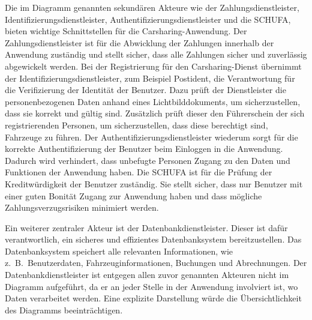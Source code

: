 Die im Diagramm genannten sekundären Akteure wie der Zahlungsdienstleister, Identifizierungsdienstleister, Authentifizierungsdienstleister und die SCHUFA, bieten wichtige Schnittstellen für die Carsharing-Anwendung.
Der Zahlungsdienstleister ist für die Abwicklung der Zahlungen innerhalb der Anwendung zuständig und stellt sicher, dass alle Zahlungen sicher und zuverlässig abgewickelt werden.
Bei der Registrierung für den Carsharing-Dienst übernimmt der Identifizierungsdienstleister, zum Beispiel Postident, die Verantwortung für die Verifizierung der Identität der Benutzer.
Dazu prüft der Dienstleister die personenbezogenen Daten anhand eines Lichtbilddokuments, um sicherzustellen, dass sie korrekt und gültig sind.
Zusätzlich prüft dieser den Führerschein der sich registrierenden Personen, um sicherzustellen, dass diese berechtigt sind, Fahrzeuge zu führen.
Der Authentifizierungsdienstleister wiederum sorgt für die korrekte Authentifizierung der Benutzer beim Einloggen in die Anwendung.
Dadurch wird verhindert, dass unbefugte Personen Zugang zu den Daten und Funktionen der Anwendung haben.
Die SCHUFA ist für die Prüfung der Kreditwürdigkeit der Benutzer zuständig.
Sie stellt sicher, dass nur Benutzer mit einer guten Bonität Zugang zur Anwendung haben und dass mögliche Zahlungsverzugsrisiken minimiert werden.

Ein weiterer zentraler Akteur ist der Datenbankdienstleister.
Dieser ist dafür verantwortlich, ein sicheres und effizientes Datenbanksystem bereitzustellen.
Das Datenbanksystem speichert alle relevanten Informationen, wie z.\ B.\ Benutzerdaten, Fahrzeuginformationen, Buchungen und Abrechnungen.
Der Datenbankdienstleister ist entgegen allen zuvor genannten Akteuren nicht im Diagramm aufgeführt, da er an jeder Stelle in der Anwendung involviert ist, wo Daten verarbeitet werden.
Eine explizite Darstellung würde die Übersichtlichkeit des Diagramms beeinträchtigen.